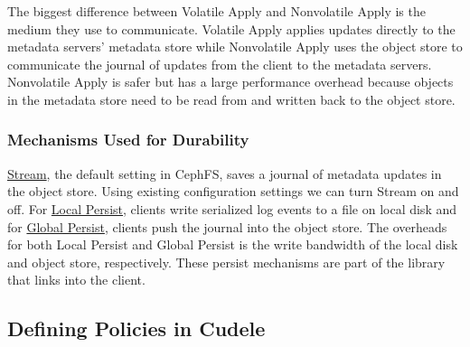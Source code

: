 The biggest difference between Volatile Apply and Nonvolatile Apply is
the medium they use to communicate. Volatile Apply applies updates directly
to the metadata servers' metadata store while Nonvolatile Apply uses the
object store to communicate the journal of updates from the client to the
metadata servers.  Nonvolatile Apply is safer but has a large performance
overhead because objects in the metadata store need to be read from and written
back to the object store.


\subsubsection{Mechanisms Used for Durability} \underline{Stream}, the default
setting in CephFS, saves a journal of metadata updates in the object store.
Using existing configuration settings we can turn Stream on and off.  For
\underline{Local Persist}, clients write serialized log events to a file on
local disk and for \underline{Global Persist}, clients push the journal into
the object store. The overheads for both Local Persist and Global Persist is
the write bandwidth of the local disk and object store, respectively.  These
persist mechanisms are part of the library that links into the client.

\subsection{Defining Policies in Cudele}
\label{sec:setting-policies-with-cudele}

